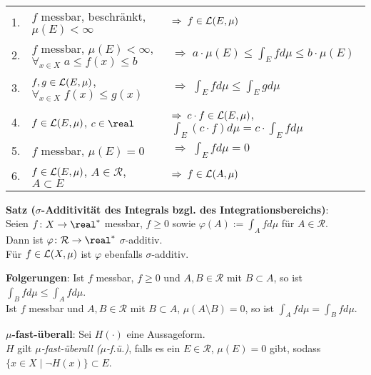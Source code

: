\begin{tabular}{lll}
    \toprule
    1. & $f$ messbar, beschränkt, $\mu(E) < \infty$ &
    $\Rightarrow\; f \in \mathcal{L}(E, \mu)$ \\[2mm]

    2. & $f$ messbar, $\mu(E) < \infty$,
    $\forall_{x \in X}\; a \le f(x) \le b$ &
    $\Rightarrow\; a \cdot \mu(E) \le \int_E f d\mu \le b \cdot \mu(E)$ \\[2mm]

    3. & $f, g \in \mathcal{L}(E, \mu)$, $\forall_{x \in X}\; f(x) \le g(x)$ &
    $\Rightarrow\; \int_E f d\mu \le \int_E g d\mu$ \\[2mm]

    4. & $f \in \mathcal{L}(E, \mu)$, $c \in \real$ &
    $\Rightarrow\; c \cdot f \in \mathcal{L}(E, \mu)$,
    $\int_E (c \cdot f) d\mu = c \cdot \int_E f d\mu$ \\[2mm]

    5. & $f$ messbar, $\mu(E) = 0$ &
    $\Rightarrow\; \int_E f d\mu = 0$ \\[2mm]

    6. & $f \in \mathcal{L}(E, \mu)$, $A \in \mathcal{R}$, $A \subset E$ &
    $\Rightarrow\; f \in \mathcal{L}(A, \mu)$ \\
    \bottomrule
\end{tabular}

\vspace{4mm}

\linie

\textbf{Satz ($\sigma$-Additivität des Integrals bzgl. des
Integrationsbereichs)}: \\
Seien $f\colon X \rightarrow \real^\ast$ messbar, $f \ge 0$
sowie $\varphi(A) := \int_A f d\mu$ für $A \in \mathcal{R}$. \\
Dann ist $\varphi\colon \mathcal{R} \rightarrow \real^\ast$
$\sigma$-additiv. \\
Für $f \in \mathcal{L}(X, \mu)$ ist $\varphi$ ebenfalls
$\sigma$-additiv.

\textbf{Folgerungen}:
Ist $f$ messbar, $f \ge 0$ und $A, B \in \mathcal{R}$ mit $B \subset A$,
so ist $\int_B f d\mu \le \int_A f d\mu$. \\
Ist $f$ messbar und $A, B \in \mathcal{R}$ mit $B \subset A$,
$\mu(A \setminus B) = 0$, so ist $\int_A f d\mu = \int_B f d\mu$.

\linie

\textbf{$\mu$-fast-überall}:
Sei $H(\cdot)$ eine Aussageform. \\
$H$ gilt \emph{$\mu$-fast-überall ($\mu$-f.ü.)},
falls es ein $E \in \mathcal{R}$, $\mu(E) = 0$
gibt, sodass $\{x \in X \;|\; \lnot H(x)\} \subset E$.

